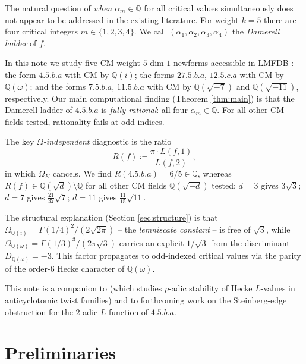\documentclass[10pt]{article}
\theoremstyle{definition}
\newcommand{\Q}{\mathbb{Q}}
\begin{document}
\smallskip

The natural question of \emph{when} $\alpha_m \in \Q$ for all critical values
simultaneously does not appear to be addressed in the existing literature.  For weight
$k = 5$ there are four critical integers $m \in \{1,2,3,4\}$.  We call
$(\alpha_1, \alpha_2, \alpha_3, \alpha_4)$ the \emph{Damerell ladder} of $f$.

\smallskip

In this note we study five CM weight-$5$ dim-$1$ newforms accessible in LMFDB
\cite{LMFDB}: the form $4.5.b.a$ with CM by $\Q(i)$; the forms $27.5.b.a$,
$12.5.c.a$ with CM by $\Q(\omega)$; and the forms $7.5.b.a$, $11.5.b.a$
with CM by $\Q(\sqrt{-7})$ and $\Q(\sqrt{-11})$, respectively.  Our main
computational finding (Theorem \ref{thm:main}) is that the Damerell ladder
of $4.5.b.a$ is \emph{fully rational}: all four $\alpha_m \in \Q$.  For all
other CM fields tested, rationality fails at odd indices.

\smallskip

The key \emph{$\Omega$-independent} diagnostic is the ratio
\begin{equation}\label{eq:R}
  R(f) \coloneqq \frac{\pi \cdot L(f,1)}{L(f,2)},
\end{equation}
in which $\Omega_K$ cancels.  We find $R(4.5.b.a) = 6/5 \in \Q$, whereas
$R(f) \in \Q(\sqrt{d}) \setminus \Q$ for all other CM fields $\Q(\sqrt{-d})$
tested: $d=3$ gives $3\sqrt{3}$; $d=7$ gives $\tfrac{21}{32}\sqrt{7}$;
$d=11$ gives $\tfrac{11}{15}\sqrt{11}$.

\smallskip

The structural explanation (Section \ref{sec:structure}) is that $\Omega_{\Q(i)} =
\Gamma(1/4)^2/(2\sqrt{2\pi})$ -- the \emph{lemniscate constant} -- is free of
$\sqrt{3}$, while $\Omega_{\Q(\omega)} = \Gamma(1/3)^3/(2\pi\sqrt{3})$ carries an
explicit $1/\sqrt{3}$ from the discriminant $D_{\Q(\omega)} = -3$.  This factor
propagates to odd-indexed critical values via the parity of the order-$6$ Hecke
character of $\Q(\omega)$.

\smallskip

This note is a companion to \cite{He25} (which studies $p$-adic stability of
Hecke $L$-values in anticyclotomic twist families) and to forthcoming work on the
Steinberg-edge obstruction for the $2$-adic $L$-function of $4.5.b.a$.


\section{Preliminaries}
\label{sec:prelim}
\end{document}
